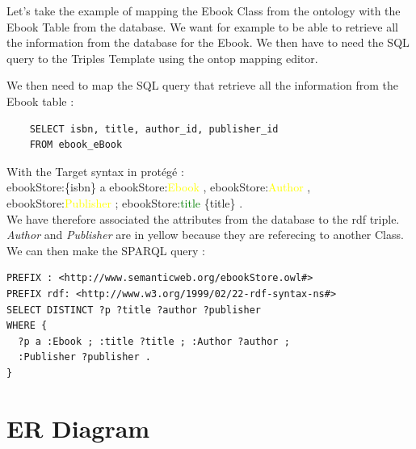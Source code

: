 \documentclass[a4paper,12pt]{article}
\begin{document}
Let's take the example of mapping the Ebook Class from the ontology with the Ebook Table from the database. We want for example to be able to retrieve all the information from the database for the Ebook. We then have to need the SQL query to the Triples Template using the ontop mapping editor.

We then need to map the SQL query that retrieve all the information from the Ebook table : 
\begin{lstlisting}
    SELECT isbn, title, author_id, publisher_id
    FROM ebook_eBook
\end{lstlisting}

With the Target syntax in protégé :\\

\noindent ebookStore:\{isbn\} a ebookStore:\textcolor{yellow}{Ebook} , ebookStore:\textcolor{yellow}{Author} , ebookStore:\textcolor{yellow}{Publisher} ; ebookStore:\textcolor{green}{title} \{title\} .\\

We have therefore associated the attributes from the database to the rdf triple. \textit{Author} and \textit{Publisher} are in yellow because they are referecing to another Class. We can then make the SPARQL query : 

\begin{lstlisting}
PREFIX : <http://www.semanticweb.org/ebookStore.owl#>
PREFIX rdf: <http://www.w3.org/1999/02/22-rdf-syntax-ns#>
SELECT DISTINCT ?p ?title ?author ?publisher
WHERE {
  ?p a :Ebook ; :title ?title ; :Author ?author ; 
  :Publisher ?publisher .
}   
\end{lstlisting}

\section{ER Diagram}
\begin{center}
\end{center}
\end{document}
